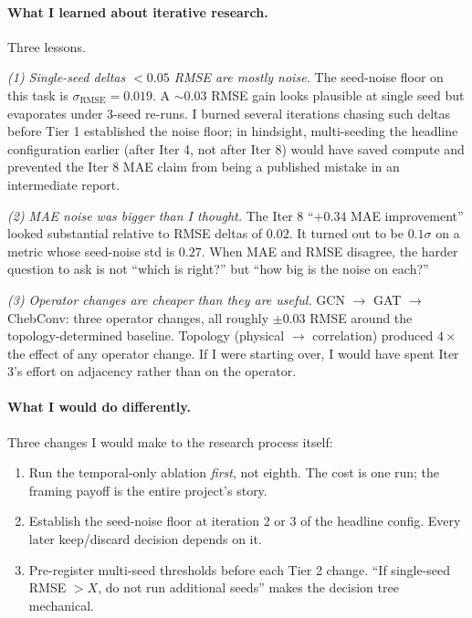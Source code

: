 \documentclass{article}
\begin{document}
\paragraph{What I learned about iterative research.}
Three lessons.

\emph{(1) Single-seed deltas $<0.05$ RMSE are mostly noise.} The seed-noise floor on this task is $\sigma_{\mathrm{RMSE}} = 0.019$. A $\sim 0.03$ RMSE gain looks plausible at single seed but evaporates under 3-seed re-runs. I burned several iterations chasing such deltas before Tier 1 established the noise floor; in hindsight, multi-seeding the headline configuration earlier (after Iter 4, not after Iter 8) would have saved compute and prevented the Iter 8 MAE claim from being a published mistake in an intermediate report.

\emph{(2) MAE noise was bigger than I thought.} The Iter 8 ``$+0.34$ MAE improvement'' looked substantial relative to RMSE deltas of $0.02$. It turned out to be $0.1\sigma$ on a metric whose seed-noise std is $0.27$. When MAE and RMSE disagree, the harder question to ask is not ``which is right?'' but ``how big is the noise on each?''

\emph{(3) Operator changes are cheaper than they are useful.} GCN $\to$ GAT $\to$ ChebConv: three operator changes, all roughly $\pm 0.03$ RMSE around the topology-determined baseline. Topology (physical $\to$ correlation) produced $4\times$ the effect of any operator change. If I were starting over, I would have spent Iter 3's effort on adjacency rather than on the operator.

\paragraph{What I would do differently.}
Three changes I would make to the research process itself:
\begin{enumerate}[itemsep=0pt,topsep=2pt]
    \item Run the temporal-only ablation \emph{first}, not eighth. The cost is one run; the framing payoff is the entire project's story.
    \item Establish the seed-noise floor at iteration 2 or 3 of the headline config. Every later keep/discard decision depends on it.
    \item Pre-register multi-seed thresholds before each Tier 2 change. ``If single-seed RMSE $> X$, do not run additional seeds'' makes the decision tree mechanical.
\end{enumerate}
\end{document}
